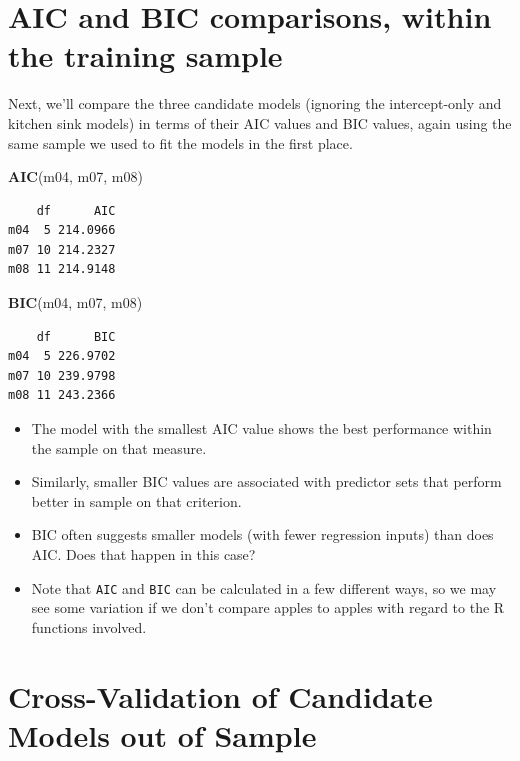 \documentclass[]{book}
\newenvironment{Shaded}{\begin{snugshade}}{\end{snugshade}}
\newcommand{\KeywordTok}[1]{\textcolor[rgb]{0.13,0.29,0.53}{\textbf{#1}}}
\newcommand{\NormalTok}[1]{#1}
\providecommand{\tightlist}{%
  \setlength{\itemsep}{0pt}\setlength{\parskip}{0pt}}
\theoremstyle{definition}
\theoremstyle{definition}
\theoremstyle{definition}
\theoremstyle{remark}
\begin{document}
\section{AIC and BIC comparisons, within the training
sample}\label{aic-and-bic-comparisons-within-the-training-sample}

Next, we'll compare the three candidate models (ignoring the
intercept-only and kitchen sink models) in terms of their AIC values and
BIC values, again using the same sample we used to fit the models in the
first place.

\begin{Shaded}
\begin{Highlighting}[]
\KeywordTok{AIC}\NormalTok{(m04, m07, m08)}
\end{Highlighting}
\end{Shaded}

\begin{verbatim}
    df      AIC
m04  5 214.0966
m07 10 214.2327
m08 11 214.9148
\end{verbatim}

\begin{Shaded}
\begin{Highlighting}[]
\KeywordTok{BIC}\NormalTok{(m04, m07, m08)}
\end{Highlighting}
\end{Shaded}

\begin{verbatim}
    df      BIC
m04  5 226.9702
m07 10 239.9798
m08 11 243.2366
\end{verbatim}

\begin{itemize}
\tightlist
\item
  The model with the smallest AIC value shows the best performance
  within the sample on that measure.
\item
  Similarly, smaller BIC values are associated with predictor sets that
  perform better in sample on that criterion.
\item
  BIC often suggests smaller models (with fewer regression inputs) than
  does AIC. Does that happen in this case?
\item
  Note that \texttt{AIC} and \texttt{BIC} can be calculated in a few
  different ways, so we may see some variation if we don't compare
  apples to apples with regard to the R functions involved.
\end{itemize}

\section{Cross-Validation of Candidate Models out of
Sample}\label{cross-validation-of-candidate-models-out-of-sample}
\end{document}
